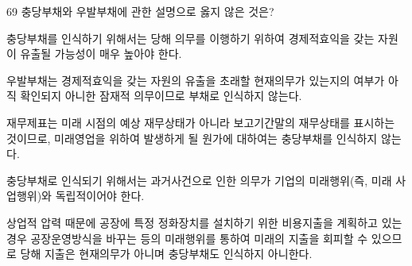 \begin{question}{69}
충당부채와 우발부채에 관한 설명으로 옳지 않은 것은?
\begin{choices}
  \item 충당부채를 인식하기 위해서는 당해 의무를 이행하기 위하여 경제적효익을 갖는 자원이 유출될 가능성이 매우 높아야 한다.
  \item 우발부채는 경제적효익을 갖는 자원의 유출을 초래할 현재의무가 있는지의 여부가 아직 확인되지 아니한 잠재적 의무이므로 부채로 인식하지 않는다.
  \item 재무제표는 미래 시점의 예상 재무상태가 아니라 보고기간말의 재무상태를 표시하는 것이므로, 미래영업을 위하여 발생하게 될 원가에 대하여는 충당부채를 인식하지 않는다.
  \item 충당부채로 인식되기 위해서는 과거사건으로 인한 의무가 기업의 미래행위(즉, 미래 사업행위)와 독립적이어야 한다.
  \item 상업적 압력 때문에 공장에 특정 정화장치를 설치하기 위한 비용지출을 계획하고 있는 경우 공장운영방식을 바꾸는 등의 미래행위를 통하여 미래의 지출을 회피할 수 있으므로 당해 지출은 현재의무가 아니며 충당부채도 인식하지 아니한다.
\end{choices}
\end{question}
